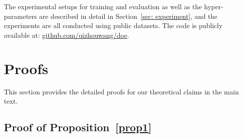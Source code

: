 \documentclass{article} \usepackage{iclr2022_conference,times}
\begin{document}
The experimental setups for training and evaluation as well as the hyper-parameters are described in detail in Section~\ref{sec: experiment}, and the experiments are all conducted using public datasets. The code is publicly available at: \href{https://github.com/QizhouWang/DOE}{{github.com/qizhouwang/doe}}.






\clearpage
\appendix

\section{Proofs} \label{app: proof}

This section provides the detailed proofs for our theoretical claims in the main text.

\subsection{Proof of Proposition~\ref{prop1}} \label{app: proof1}
\end{document}
